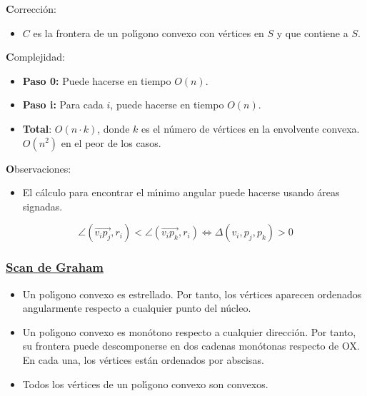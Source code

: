 \documentclass[ebook,oneside]{memoir}
\begin{document}
{\textbf Correcci\'{o}n:}

\begin{itemize}
  \item $C$ es la frontera de un pol\'{\i}gono convexo con v\'{e}rtices en
$S$ y que contiene a $S$.
\end{itemize}


{\textbf Complejidad:}

\begin{itemize}
  \item \textbf{Paso 0:} Puede hacerse en tiempo $O(n)$.
  \item \textbf{Paso i:} Para cada $i$, puede hacerse en tiempo $O(n)$.
  \item \textbf{Total}: $O(n\cdot k)$, donde $k$ es el n\'{u}mero de v\'{e}rtices en la
envolvente convexa. $O(n^2)$ en el peor de los casos.
\end{itemize}


{\textbf Observaciones:}

\begin{itemize}
\item El c\'{a}lculo para encontrar el m\'{\i}nimo angular puede hacerse
usando \'{a}reas signadas.
\end{itemize}
$$\angle (\overrightarrow{v_ip_j},r_i) <
\angle (\overrightarrow{v_ip_k},r_i) \Leftrightarrow
\Delta(v_i,p_j,p_k)>0$$


\subsubsection{\underline{Scan de Graham}}

\begin{itemize}
  \item Un pol\'{\i}gono convexo es estrellado. Por tanto, los v\'{e}rtices
aparecen ordenados angularmente respecto a cualquier punto del
n\'{u}cleo.
  \item Un pol\'{\i}gono convexo es mon\'{o}tono respecto a cual\-quier
direcci\'{o}n. Por tanto, su frontera puede des\-com\-po\-ner\-se en
dos cadenas mon\'{o}tonas respecto de OX. En cada una, los v\'{e}rtices
est\'{a}n ordenados por abscisas.
  \item Todos los v\'{e}rtices de un pol\'{\i}gono convexo son convexos.
\end{itemize}

\vspace{0.6cm}
\end{document}
